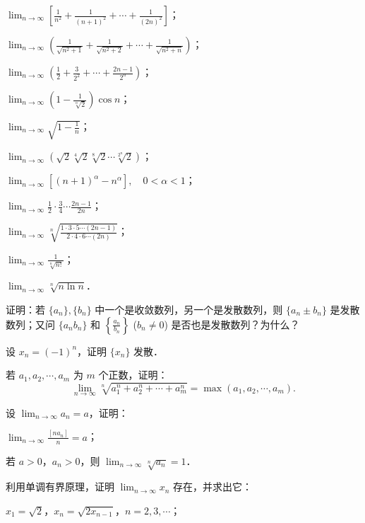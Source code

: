 \begin{xiti}
\begin{ziti}
  \item $\lim_{n\to\infty}\left[\frac{1}{n^2} + \frac{1}{(n+1)^2} + \cdots + \frac{1}{(2n)^2}\right]$；
  \item $\lim_{n \to \infty} \left(\frac{1}{\sqrt{n^2 + 1}} + \frac{1}{\sqrt{n^2 + 2}} + \cdots + \frac{1}{\sqrt{n^2 + n}}\right)$；
  \item $\lim_{n\to\infty}\left(\frac{1}{2} + \frac{3}{2^2} + \cdots + \frac{2n-1}{2^n}\right)$；
  \item $\lim_{n \to \infty} \left(1 - \frac{1}{\sqrt[n]{2}}\right) \cos n$；
  \item $\lim_{n \to \infty} \sqrt{1 - \frac{1}{n}}$；
  \item $\lim_{n \to \infty} (\sqrt{2} \sqrt[4]{2} \sqrt[8]{2} \cdots \sqrt[2^n]{2})$；
  \item $\lim_{n \to \infty} \left[(n + 1)^\alpha - n^\alpha\right],\quad 0 < \alpha < 1$；
  \item $\lim_{n \to \infty} \frac{1}{2} \cdot \frac{3}{4} \cdots \frac{2n-1}{2n}$；
  \item $\lim_{n \to \infty} \sqrt[n]{\frac{1 \cdot 3 \cdot 5 \cdots (2n-1)}{2 \cdot 4 \cdot 6 \cdots (2n)}}$；
  \item $\lim_{n \to \infty} \frac{1}{\sqrt[n]{n!}}$；
  \item $\lim_{n \to \infty} \sqrt[n]{n \ln n}$．
  \end{ziti}
\item 证明：若 $\{a_n\},\{b_n\}$ 中一个是收敛数列，另一个是发散数列，则 $\{a_n \pm b_n\}$ 是发散数列；又问 $\{a_n b_n\}$ 和 $\left\{\frac{a_n}{b_n}\right\}$ ($b_n \neq 0$) 是否也是发散数列？为什么？
\item 设 $x_n = (-1)^n$，证明 $\{x_n\}$ 发散．
\item 若 $a_1, a_2, \cdots, a_m$ 为 $m$ 个正数，证明：
\[
\lim_{n\to\infty}\sqrt[n]{a_1^n + a_2^n + \cdots + a_m^n} = \max(a_1, a_2, \cdots, a_m).
\]
\item 设 $\lim_{n\to\infty}a_n = a$，证明：
  \begin{ziti}
  \item $\lim_{n \to \infty} \frac{[n a_n]}{n} = a$；
  \item 若 $a > 0$，$a_n > 0$，则 $\lim_{n \to \infty} \sqrt[n]{a_n} = 1$．
  \end{ziti}
\item 利用单调有界原理，证明 $\lim_{n\to\infty}x_n$ 存在，并求出它：
  \begin{ziti}
  \item $x_1 = \sqrt{2}$，$x_n = \sqrt{2 x_{n-1}}$，$n=2,3,\cdots$；

\end{ziti}
\end{xiti}
